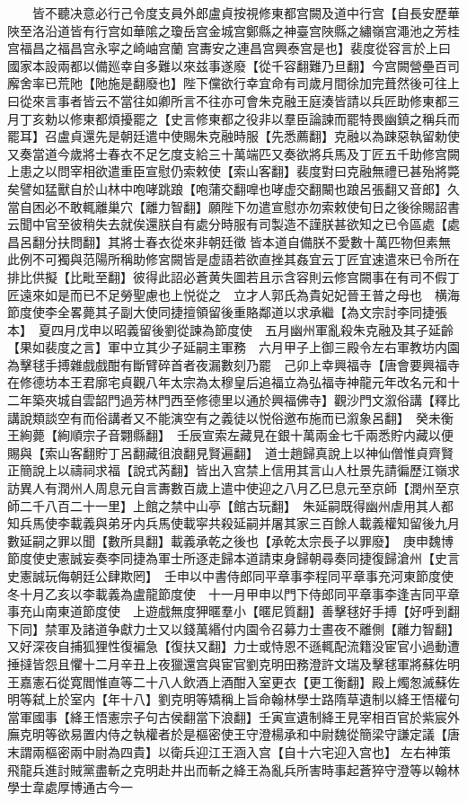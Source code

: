　　皆不聽决意必行己令度支員外郎盧貞按視修東都宫闕及道中行宫【自長安歷華陜至洛沿道皆有行宫如華隂之瓊岳宫金城宫鄭縣之神臺宫陜縣之繡嶺宫澠池之芳桂宫福昌之福昌宫永寜之崎岫宫蘭宫夀安之連昌宫興泰宫是也】裴度從容言於上曰國家本設兩都以備廵幸自多難以來兹事遂廢【從千容翻難乃旦翻】今宫闕營壘百司廨舍率已荒阤【阤施是翻廢也】陛下儻欲行幸宜命有司歲月間徐加完葺然後可往上曰從來言事者皆云不當往如卿所言不往亦可會朱克融王庭湊皆請以兵匠助修東都三月丁亥勅以修東都煩擾罷之【史言修東都之役非以羣臣論諫而罷特畏幽鎮之稱兵而罷耳】召盧貞還先是朝廷遣中使賜朱克融時服【先悉薦翻】克融以為踈惡執留勅使又奏當道今歲將士春衣不足乞度支給三十萬端匹又奏欲將兵馬及丁匠五千助修宫闕上患之以問宰相欲遣重臣宣慰仍索敕使【索山客翻】裴度對曰克融無禮已甚殆將斃矣譬如猛獸自於山林中咆哮跳踉【咆蒲交翻嘷也哮虚交翻闞也踉呂張翻又音郎】久當自困必不敢輒離巢穴【離力智翻】願陛下勿遣宣慰亦勿索敕使旬日之後徐賜詔書云聞中官至彼稍失去就俟還朕自有處分時服有司製造不謹朕甚欲知之已令區處【處昌呂翻分扶問翻】其將士春衣從來非朝廷徵皆本道自備朕不愛數十萬匹物但素無此例不可獨與范陽所稱助修宮闕皆是虚語若欲直挫其姦宜云丁匠宜速遣來已令所在排比供擬【比毗至翻】彼得此詔必蒼黄失圖若且示含容則云修宫闕事在有司不假丁匠遠來如是而已不足勞聖慮也上悦從之　立才人郭氏為貴妃妃晉王普之母也　横海節度使李全畧薨其子副大使同捷擅領留後重賂鄰道以求承繼【為文宗討李同捷張本】　夏四月戊申以昭義留後劉從諫為節度使　五月幽州軍亂殺朱克融及其子延齡【果如裴度之言】軍中立其少子延嗣主軍務　六月甲子上御三殿令左右軍教坊内園為擊毬手搏雜戲戲酣有斷臂碎首者夜漏數刻乃罷　己卯上幸興福寺【唐會要興福寺在修德坊本王君廓宅貞觀八年太宗為太穆皇后追福立為弘福寺神龍元年改名元和十二年築夾城自雲韶門過芳林門西至修德里以通於興福佛寺】觀沙門文溆俗講【釋比講說類談空有而俗講者又不能演空有之義徒以悦俗邀布施而已溆象呂翻】　癸未衡王絢薨【絢順宗子音翾縣翻】　壬辰宣索左藏見在銀十萬兩金七千兩悉貯内藏以便賜與【索山客翻貯丁呂翻藏徂浪翻見賢遍翻】　道士趙歸真說上以神仙僧惟貞齊賢正簡說上以禱祠求福【說式芮翻】皆出入宫禁上信用其言山人杜景先請徧歷江嶺求訪異人有潤州人周息元自言夀數百歲上遣中使迎之八月乙巳息元至京師【潤州至京師二千八百二十一里】上館之禁中山亭【館古玩翻】　朱延嗣既得幽州虐用其人都知兵馬使李載義與弟牙内兵馬使載寜共殺延嗣并屠其家三百餘人載義權知留後九月數延嗣之罪以聞【數所具翻】載義承乾之後也【承乾太宗長子以罪廢】　庚申魏博節度使史憲誠妄奏李同捷為軍士所逐走歸本道請束身歸朝尋奏同捷復歸滄州【史言史憲誠玩侮朝廷公肆欺罔】　壬申以中書侍郎同平章事李程同平章事充河東節度使　冬十月乙亥以李載義為盧龍節度使　十一月甲申以門下侍郎同平章事李逢吉同平章事充山南東道節度使　上遊戲無度狎暱羣小【暱尼質翻】善擊毬好手搏【好呼到翻下同】禁軍及諸道争獻力士又以錢萬緡付内園令召募力士晝夜不離側【離力智翻】又好深夜自捕狐狸性復褊急【復扶又翻】力士或恃恩不遜輒配流籍没宦官小過動遭捶撻皆怨且懼十二月辛丑上夜獵還宫與宦官劉克明田務澄許文瑞及擊毬軍將蘇佐明王嘉憲石從寛閻惟直等二十八人飲酒上酒酣入室更衣【更工衡翻】殿上燭怱滅蘇佐明等弑上於室内【年十八】劉克明等矯稱上旨命翰林學士路隋草遺制以絳王悟權句當軍國事【絳王悟憲宗子句古侯翻當下浪翻】壬寅宣遺制絳王見宰相百官於紫宸外廡克明等欲易置内侍之執權者於是樞密使王守澄楊承和中尉魏從簡梁守謙定議【唐末謂兩樞密兩中尉為四貴】以衛兵迎江王涵入宫【自十六宅迎入宫也】左右神策飛龍兵進討賊黨盡斬之克明赴井出而斬之絳王為亂兵所害時事起蒼猝守澄等以翰林學士韋處厚博通古今一